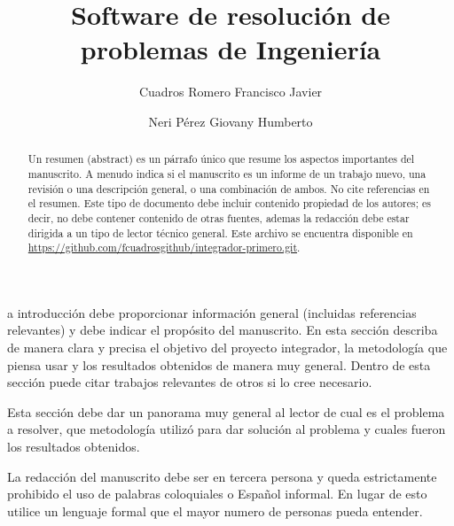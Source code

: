 \documentclass{IEEEcsmag}
\begin{document}

\title{Software de resolución de problemas de Ingeniería }

\author{Cuadros Romero Francisco Javier}

\author{Neri Pérez Giovany Humberto}



\begin{abstract}
Un resumen (abstract) es un párrafo único que resume los aspectos importantes del manuscrito. A menudo indica si el manuscrito es un informe de un trabajo nuevo, una revisión o una descripción general, o una combinación de ambos. No cite referencias en el resumen. Este tipo de documento debe incluir contenido propiedad de los autores; es decir, no debe contener contenido de otras fuentes, ademas la redacción debe  estar dirigida a un tipo de lector técnico general. Este archivo se encuentra disponible en \href{https://github.com/fcuadrosgithub/integrador-primero.git}{https://github.com/fcuadrosgithub/integrador-primero.git}.
\end{abstract}

\maketitle


a introducción debe proporcionar información general (incluidas referencias relevantes) y debe indicar el propósito del manuscrito. En esta sección describa de manera clara y precisa el objetivo del proyecto integrador, la metodología que piensa usar y los resultados obtenidos de manera muy general. Dentro de esta sección puede citar trabajos relevantes de otros si lo cree necesario.

Esta sección debe dar un panorama muy general al lector de cual es el problema a resolver, que metodología utilizó para dar solución al problema y cuales fueron los resultados obtenidos. 

La redacción del manuscrito debe ser en tercera persona y queda estrictamente prohibido el uso de palabras coloquiales o Español informal. En lugar de esto utilice un lenguaje formal que el mayor numero de personas pueda entender.
\end{document}
